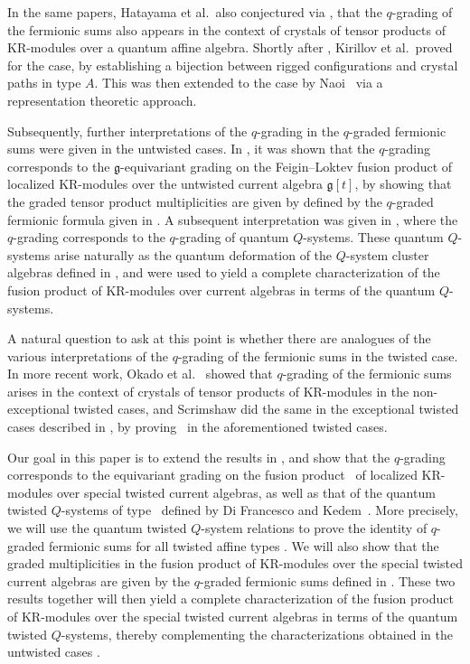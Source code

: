 \documentclass[pdftex]{sigma}
\numberwithin{equation}{section}
\begin{document}
In the same papers, Hatayama et al.\ also conjectured via \cite[Conjecture~3.1]{HKOTY99}, \cite[Conjecture~3.10]{HKOTT02} that the $q$-grading of the fermionic sums also appears in the context of crystals of tensor products of KR-modules over a quantum affine algebra. Shortly after \cite{HKOTY99}, Kirillov et al.\ proved \cite[Conjecture~3.1]{HKOTY99} for the  case, by establishing a bijection between rigged configurations and crystal paths in type $A$. This was then extended to the  case by Naoi~\cite{Naoi12} via a representation theoretic approach.

Subsequently, further interpretations of the $q$-grading in the $q$-graded fermionic sums were given in the untwisted cases. In \cite{AK07, DFK08}, it was shown that the $q$-grading corresponds to the $\mathfrak{g}$-equivariant grading on the Feigin--Loktev fusion product \cite{FL99} of localized KR-modules over the untwisted current algebra $\mathfrak{g}[t]$, by showing that the graded tensor product multiplicities are given by defined by the $q$-graded fermionic formula given in \cite[equation~(4.3)]{HKOTY99}. A subsequent interpretation was given in \cite{DFK14, Lin21}, where the $q$-grading corresponds to the $q$-grading of quantum $Q$-systems. These quantum $Q$-systems arise naturally as the quantum deformation of the $Q$-system cluster algebras defined in \cite{DFK09, Kedem08}, and were used to yield a complete characterization of the fusion product of KR-modules over current algebras in terms of the quantum $Q$-systems.

A natural question to ask at this point is whether there are analogues of the various interpretations of the $q$-grading of the fermionic sums \cite[equations~(4.5) and (4.20)]{HKOTT02} in the twisted case. In more recent work, Okado et al.\ \cite{OSS18} showed that $q$-grading of the fermionic sums arises in the context of crystals of tensor products of KR-modules in the non-exceptional twisted cases, and Scrimshaw did the same in the exceptional twisted cases described in \cite{Scrimshaw16, Scrimshaw20}, by proving~\cite[Conjecture~3.10]{HKOTT02} in the aforementioned twisted cases.

Our goal in this paper is to extend the results in \cite{AK07, DFK14, Lin21}, and show that the $q$-grading corresponds to the equivariant grading on the fusion product~\cite{KV16} of localized KR-modules over special twisted current algebras, as well as that of the quantum twisted $Q$-systems of type~ defined by Di Francesco and Kedem~\cite{DFK24}. More precisely, we will use the quantum twisted $Q$-system relations to prove the identity \cite[Conjecture~4.3]{HKOTT02} of $q$-graded fermionic sums for all twisted affine types . We will also show that the graded multiplicities in the fusion product of KR-modules over the special twisted current algebras are given by the $q$-graded fermionic sums defined in \cite[equation~(4.5)]{HKOTT02}. These two results together will then yield a complete characterization of the fusion product of KR-modules over the special twisted current algebras in terms of the quantum twisted $Q$-systems, thereby complementing the characterizations obtained in the untwisted cases \cite{DFK14, Lin21}.
\end{document}
